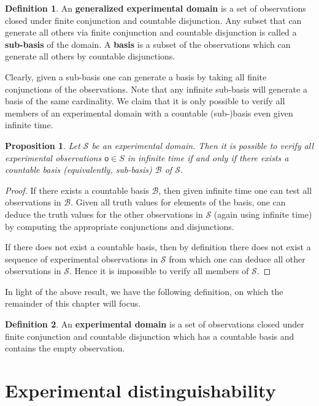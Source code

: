 \documentclass[review]{elsarticle}
\theoremstyle{plain}%
\newtheorem{prop}[thm]{Proposition}
\theoremstyle{definition}
\newtheorem{defn}{Definition}[section]
\theoremstyle{remark}
\begin{document}
\begin{defn}
	An \textbf{generalized experimental domain} is a set of observations closed under finite conjunction and countable disjunction. Any subset that can generate all others via finite conjunction and countable disjunction is called a \textbf{sub-basis} of the domain. A \textbf{basis} is a subset of the observations which can generate all others by countable disjunctions. 
\end{defn}

Clearly, given a sub-basis one can generate a basis by taking all finite conjunctions of the observations. Note that any infinite sub-basis will generate a basis of the same cardinality. We claim that it is only possible to verify all members of an experimental domain with a countable (sub-)basis even given infinite time. 

\begin{prop}
Let $\mathcal{S}$ be an experimental domain. Then it is possible to verify all experimental observations $\mathsf{o}\in S$ in infinite time if and only if there exists a countable basis (equivalently, sub-basis) $\mathcal{B}$ of $\mathcal{S}$. 
\end{prop}
\begin{proof}
If there exists a countable basis $\mathcal{B}$, then given infinite time one can test all observations in $\mathcal{B}$. Given all truth values for elements of the basis, one can deduce the truth values for the other observations in $\mathcal{S}$ (again using infinite time) by computing the appropriate conjunctions and disjunctions. 

If there does not exist a countable basis, then by definition there does not exist a sequence of experimental observations in $\mathcal{S}$ from which one can deduce all other observations in $\mathcal{S}$. Hence it is impossible to verify all members of $\mathcal{S}$.
\end{proof}

In light of the above result, we have the following definition, on which the remainder of this chapter will focus. 

\begin{defn}
An \textbf{experimental domain} is a set of observations closed under finite conjunction and countable disjunction which has a countable basis and contains the empty observation. 
\end{defn}



\section{Experimental distinguishability}
\end{document}
